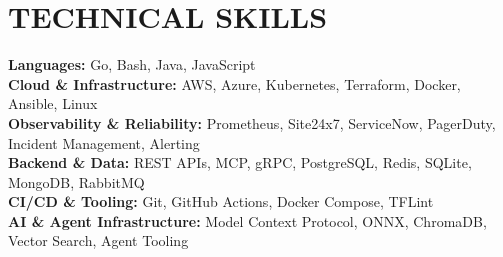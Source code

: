 \section{TECHNICAL SKILLS}

\textbf{Languages:} Go, Bash, Java, JavaScript\\
\textbf{Cloud \& Infrastructure:} AWS, Azure, Kubernetes, Terraform, Docker, Ansible, Linux\\
\textbf{Observability \& Reliability:} Prometheus, Site24x7, ServiceNow, PagerDuty, Incident Management, Alerting\\
\textbf{Backend \& Data:} REST APIs, MCP, gRPC, PostgreSQL, Redis, SQLite, MongoDB, RabbitMQ\\
\textbf{CI/CD \& Tooling:} Git, GitHub Actions, Docker Compose, TFLint\\
\textbf{AI \& Agent Infrastructure:} Model Context Protocol, ONNX, ChromaDB, Vector Search, Agent Tooling
